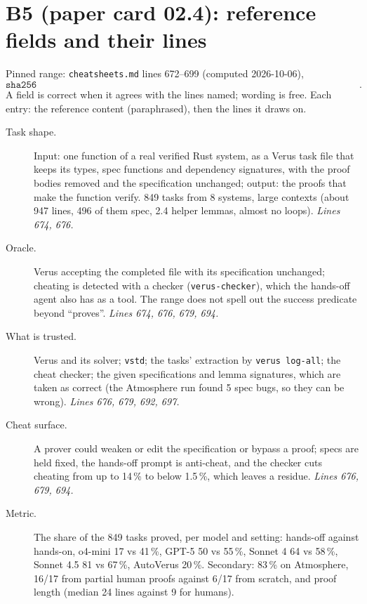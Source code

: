 \documentclass[11pt]{article}
\begin{document}
\section*{B5 (paper card 02.4): reference fields and their lines}

Pinned range: \texttt{cheatsheets.md} lines 672--699 (computed 2026-10-06),
\[ \texttt{sha256 00089348ef0724910a25cedc92d64202de038a05f23120034041cf48ed7e4ffa}. \]
A field is correct when it agrees with the lines named; wording is free. Each
entry: the reference content (paraphrased), then the lines it draws on.

\begin{description}
\item[Task shape.] Input: one function of a real verified Rust system, as a
  Verus task file that keeps its types, spec functions and dependency
  signatures, with the proof bodies removed and the specification unchanged;
  output: the proofs that make the function verify. 849 tasks from 8 systems,
  large contexts (about 947 lines, 496 of them spec, 2.4 helper lemmas, almost
  no loops). \emph{Lines 674, 676.}
\item[Oracle.] Verus accepting the completed file with its specification
  unchanged; cheating is detected with a checker (\texttt{verus-checker}),
  which the hands-off agent also has as a tool. The range does not spell out
  the success predicate beyond ``proves''. \emph{Lines 674, 676, 679, 694.}
\item[What is trusted.] Verus and its solver; \texttt{vstd}; the tasks'
  extraction by \texttt{verus log-all}; the cheat checker; the given specifications and
  lemma signatures, which are taken as correct (the Atmosphere run found 5 spec
  bugs, so they can be wrong). \emph{Lines 676, 679, 692, 697.}
\item[Cheat surface.] A prover could weaken or edit the specification or
  bypass a proof; specs are held fixed, the hands-off prompt is anti-cheat, and
  the checker cuts cheating from up to 14\,\% to below 1.5\,\%, which leaves a
  residue. \emph{Lines 676, 679, 694.}
\item[Metric.] The share of the 849 tasks proved, per model and setting:
  hands-off against hands-on, o4-mini 17 vs 41\,\%, GPT-5 50 vs 55\,\%,
  Sonnet 4 64 vs 58\,\%, Sonnet 4.5 81 vs 67\,\%, AutoVerus 20\,\%. Secondary:
  83\,\% on Atmosphere, 16/17 from partial human proofs against 6/17 from
  scratch, and proof length (median 24 lines against 9 for humans).

\end{description}
\end{document}
